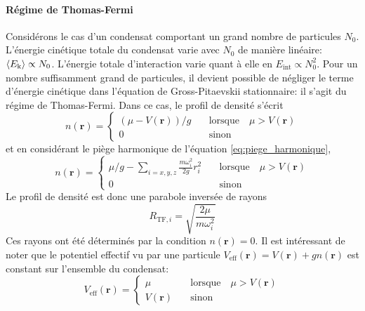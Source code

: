 \paragraph*{Régime de Thomas-Fermi}
Considérons le cas d'un condensat comportant un grand nombre de particules $N_0$. L'énergie cinétique totale du condensat varie avec $N_0$ de manière linéaire: $\left\langle E_{\mathrm{k}}\right\rangle\propto N_0$. L'énergie totale d'interaction varie quant à elle en $E_{\mathrm{int}}\propto N_0^2$. Pour un nombre suffisamment grand de particules, il devient possible de négliger le terme d'énergie cinétique dans l'équation de Gross-Pitaevskii stationnaire: il s'agit du régime de Thomas-Fermi.
Dans ce cas, le profil de densité s'écrit
\begin{equation}
n(\mathbf{r})=\left\{
					\begin{array}{ll}
						(\mu-V(\mathbf{r}))/g &\quad \text{lorsque} \quad \mu>V(\mathbf{r})\\
						0 &\quad \text{sinon}
					\end{array} 
				\right.
\end{equation}
et en considérant le piège harmonique de l'équation \ref{eq:piege_harmonique},
\begin{equation}
n(\mathbf{r})=\left\{
					\begin{array}{ll}
						\mu/g-\sum_{i=x,y,z}\frac{m\omega_i^2}{2g}r_i^2 &\quad \text{lorsque} \quad \mu>V(\mathbf{r})\\
						0 &\quad \text{sinon}
					\end{array} 
				\right.
\end{equation}
Le profil de densité est donc une parabole inversée de rayons
\begin{equation}
R_{\mathrm{TF},i}=\sqrt{\frac{2\mu}{m\omega_i^2}}
\end{equation}
Ces rayons ont été déterminés par la condition $n(\mathbf{r})=0$. Il est intéressant de noter que le potentiel effectif vu par une particule $V_{\mathrm{eff}}(\mathbf{r})=V(\mathbf{r})+gn(\mathbf{r})$ est constant sur l'ensemble du condensat:
\begin{equation}
V_{\mathrm{eff}}(\mathbf{r})= \left\{
									\begin{array}{ll}
										\mu &\quad \text{lorsque} \quad \mu>V(\mathbf{r})\\
										V(\mathbf{r}) &\quad \text{sinon}
									\end{array}
							\right.
\end{equation}
